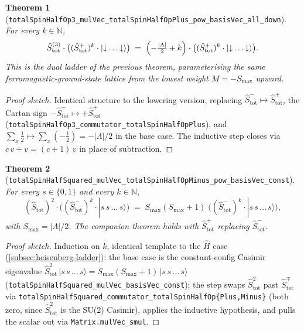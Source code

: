 \documentclass[a4paper,11pt]{article}
\newtheorem{theorem}{Theorem}
\begin{document}
\begin{theorem}[\texttt{totalSpinHalfOp3\_mulVec\_totalSpinHalfOpPlus\_pow\_basisVec\_all\_down}]
For every $k \in \mathbb{N}$,
\[
  \hat S_{\mathrm{tot}}^{(3)} \cdot
    \bigl((\hat S_{\mathrm{tot}}^{+})^{k} \cdot
            |{\downarrow}\dots{\downarrow}\rangle\bigr)
  \;=\;
  \Bigl(-\tfrac{|\Lambda|}{2} + k\Bigr) \cdot
    \bigl((\hat S_{\mathrm{tot}}^{+})^{k} \cdot
            |{\downarrow}\dots{\downarrow}\rangle\bigr).
\]
This is the dual ladder of the previous theorem, parameterising the
same ferromagnetic-ground-state lattice from the lowest weight
$M = -S_{\max}$ upward.
\end{theorem}

\begin{proof}[Proof sketch]
Identical structure to the lowering version, replacing $\hat
S_{\mathrm{tot}}^{-} \mapsto \hat S_{\mathrm{tot}}^{+}$, the Cartan
sign $-\hat S_{\mathrm{tot}}^{-} \mapsto +\hat S_{\mathrm{tot}}^{+}$
(\texttt{totalSpinHalfOp3\_commutator\_totalSpinHalfOpPlus}), and
$\sum_{x} \tfrac{1}{2} \mapsto \sum_{x} (-\tfrac{1}{2}) =
-|\Lambda|/2$ in the base case.  The inductive step closes via $c\,v
+ v = (c+1)\,v$ in place of subtraction.
\end{proof}

\begin{theorem}[\texttt{totalSpinHalfSquared\_mulVec\_totalSpinHalfOpMinus\_pow\_basisVec\_const}]
For every $s \in \{0,1\}$ and every $k \in \mathbb{N}$,
\[
  (\hat S_{\mathrm{tot}})^{2}
    \cdot \bigl((\hat S_{\mathrm{tot}}^{-})^{k} \cdot
                 |s\,s\,\dots\,s\rangle\bigr)
  \;=\; S_{\max}(S_{\max}+1)\;
    \bigl((\hat S_{\mathrm{tot}}^{-})^{k} \cdot
            |s\,s\,\dots\,s\rangle\bigr),
\]
with $S_{\max} = |\Lambda|/2$.  The companion theorem holds with
$\hat S_{\mathrm{tot}}^{+}$ replacing $\hat S_{\mathrm{tot}}^{-}$.
\end{theorem}

\begin{proof}[Proof sketch]
Induction on $k$, identical template to the $\hat H$ case
(\ref{subsec:heisenberg-ladder}): the base case is the constant-config
Casimir eigenvalue $\hat S_{\mathrm{tot}}^{2}\,
|s\,s\,\dots\,s\rangle = S_{\max}(S_{\max}+1)\,|s\,s\,\dots\,s\rangle$
(\texttt{totalSpinHalfSquared\_mulVec\_basisVec\_const}); the step
swaps $\hat S_{\mathrm{tot}}^{2}$ past $\hat S_{\mathrm{tot}}^{\mp}$
via \texttt{totalSpinHalfSquared\_commutator\_totalSpinHalfOp\{Plus,Minus\}}
(both zero, since $\hat S_{\mathrm{tot}}^{2}$ is the SU(2) Casimir),
applies the inductive hypothesis, and pulls the scalar out via
\texttt{Matrix.mulVec\_smul}.
\end{proof}
\end{document}
